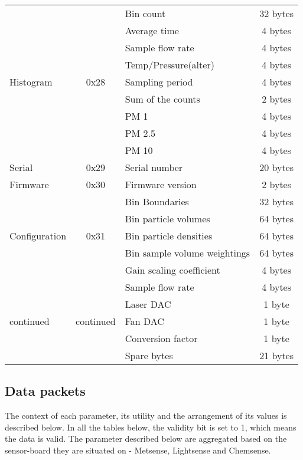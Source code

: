 \begin{center}
\begin{longtable}{|l|c|>{\centering}p{}|c|}
     \rowcolor{black!8} \multicolumn{4}{|c|}{{Alpha Sensor}} \\ \hline
        \multirow{9}{*}{Histogram} & \multirow{9}{*}{0x28} & Bin count & 32 bytes \\ \cline{3-4}
        & & Average time & 4 bytes \\ \cline{3-4}
        & & Sample flow rate & 4 bytes \\ \cline{3-4}
        & & Temp/Pressure(alter) & 4 bytes\\ \cline{3-4}
        & & Sampling period & 4 bytes \\ \cline{3-4}
        & & Sum of the counts & 2 bytes \\ \cline{3-4}
        & & PM 1 & 4 bytes \\ \cline{3-4}
        & & PM 2.5 & 4 bytes \\ \cline{3-4}
        & & PM 10 & 4 bytes \\ \hline
        Serial & 0x29 & Serial number & 20 bytes \\ \hline
        Firmware & 0x30 & Firmware version & 2 bytes \\ \hline
        \multirow{5}{*}{Configuration} & \multirow{5}{*}{0x31} & Bin Boundaries & 32 bytes \\ \cline{3-4}
        & & Bin particle volumes & 64 bytes \\ \cline{3-4}
        & & Bin particle densities & 64 bytes \\ \cline{3-4}
        & & Bin sample volume weightings & 64 bytes \\ \cline{3-4}
        & & Gain scaling coefficient & 4 bytes \\ \hline
        \multirow{5}{*}{continued} & \multirow{5}{*}{continued} & Sample flow rate & 4 bytes \\ \cline{3-4}
        & & Laser DAC & 1 byte \\ \cline{3-4}
        & & Fan DAC & 1 byte \\ \cline{3-4}
        & & Conversion factor & 1 byte \\ \cline{3-4}
        & & Spare bytes & 21 bytes \\ 

\end{longtable}
\end{center}


\newpage
\subsection{Data packets}
The context of each parameter, its utility and the arrangement of its values is described below. In all
the tables below, the validity bit is set to 1, which means the data is valid. The parameter described
below are aggregated based on the sensor-board they are situated on -
Metsense, Lightsense and Chemsense.


